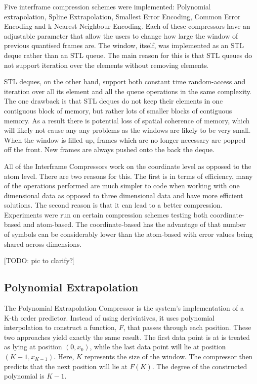 \documentclass[a4paper,11pt]{report}
\begin{document}
Five interframe compression schemes were implemented: Polynomial extrapolation, Spline Extrapolation, Smallest Error Encoding, Common Error Encoding and k-Nearest Neighbour Encoding. Each of these compressors have an adjustable parameter that allow the users to change how large the window of previous quantised frames are. The window, itself, was implemented as an STL deque rather than an STL queue. The main reason for this is that STL queues do not support iteration over the elements without removing elements. 

STL deques, on the other hand, support both constant time random-access and iteration over all its element and all the queue operations in the same complexity. The one drawback is that STL deques do not keep their elements in one contiguous block of memory, but rather lots of smaller blocks of contiguous memory. As a result there is potential loss of spatial coherence of memory, which will likely not cause any any problems as the windows are likely to be very small. When the window is filled up, frames which are no longer necessary are popped off the front. New frames are always pushed onto the back the deque.

All of the Interframe Compressors work on the coordinate level as opposed to the atom level. There are two reasons for this. The first is in terms of efficiency, many of the operations performed are much simpler to code when working with one dimensional data as opposed to three dimensional data and have more efficient solutions. The second reason is that it can lead to a better compression. Experiments were run on certain compression schemes testing both coordinate-based and atom-based. The coordinate-based has the advantage of that number of symbols can be considerably lower than the atom-based with error values being shared across dimensions.

[TODO: pic to clarify?]

\subsection{Polynomial Extrapolation}

The Polynomial Extrapolation Compressor is the system's implementation of a K-th order predictor. Instead of using deriviatives, it uses polynomial interpolation to construct a function, $F$, that passes through each position. These two approaches yield exactly the same result. The first data point is at is treated as lying at position $(0, x_0)$, while the last data point will lie at position $(K-1, x_{K-1})$. Here, $K$ represents the size of the window.  The compressor then predicts that the next position will lie at $F(K)$. The degree of the constructed polynomial is $K-1$.
\end{document}
